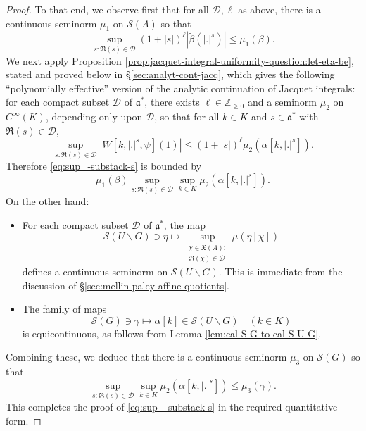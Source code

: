 \documentclass[reqno]{amsart}
\theoremstyle{plain} \newtheorem{theorem} {Theorem}
\theoremstyle{definition} \newtheorem{definition} [theorem] {Definition}
\theoremstyle{itplain} %
\numberwithin{equation}{section}
\numberwithin{theorem}{section}
\renewcommand{\geq}{\geqslant}
\renewcommand{\leq}{\leqslant}
\begin{document}
\begin{proof}
  To that end, we observe first that for all $\mathcal{D}, \ell$ as above,  there is a continuous seminorm $\mu_1$ on $\mathcal{S}(A)$ so that
  \begin{equation*}
    \sup_{s : \Re(s) \in \mathcal{D}} (1 + |s|)^{\ell} \left\lvert \tilde{\beta}(|.|^s) \right\rvert \leq \mu_1(\beta). 
  \end{equation*}
  We next apply Proposition \ref{prop:jacquet-integral-uniformity-question:let-eta-be}, stated and proved below in \S\ref{sec:analyt-cont-jacq}, which gives the following ``polynomially effective'' version of the analytic continuation of Jacquet integrals: for each compact subset $\mathcal{D}$ of $\mathfrak{a}^*$, there exists $\ell \in \mathbb{Z}_{\geq 0}$ and a seminorm $\mu_2$ on $C^\infty(K)$, depending only upon $\mathcal{D}$, so that for all $k \in K$ and $s \in \mathfrak{a}^*$ with $\Re(s) \in \mathcal{D}$,
  \begin{equation*}
    \sup_{s : \Re(s) \in \mathcal{D}} |W[k,|.|^s,\psi](1)| \leq (1 + |s|)^{\ell} \mu_2(\alpha[k,|.|^s]).   
  \end{equation*}
  Therefore \eqref{eq:sup_-substack-s} is bounded by
  \begin{equation*}
    \mu_1(\beta) \sup_{ s : \Re(s) \in \mathcal{D} } \sup_{k \in K} \mu_2(\alpha[k,|.|^s]).    
  \end{equation*}
  On the other hand:
  \begin{itemize}
  \item For each compact subset $\mathcal{D}$ of $\mathfrak{a}^*$, the map
  \begin{equation*}
    \mathcal{S}(U \backslash G)
    \ni \eta
    \mapsto \sup_{
      \substack{
        \chi \in \mathfrak{X}(A):  \\
          \Re(\chi) \in \mathcal{D}
      }
    }
    \mu(\eta[\chi])
  \end{equation*}
  defines a continuous seminorm on $\mathcal{S}(U \backslash G)$.  This is immediate from the discussion of \S\ref{sec:mellin-paley-affine-quotients}.
\item
  The family of maps
  \begin{equation*}
    \mathcal{S}(G) \ni \gamma \mapsto \alpha[k] \in \mathcal{S}(U \backslash G)
    \quad (k \in K)
  \end{equation*}
  is equicontinuous, as follows from Lemma \ref{lem:cal-S-G-to-cal-S-U-G}.
\end{itemize}
Combining these, we deduce that there is a continuous seminorm $\mu_3$ on $\mathcal{S}(G)$ so that
\begin{equation*}
  \sup_{ s : \Re(s) \in \mathcal{D} } \sup_{k \in K} \mu_2(\alpha[k,|.|^s]) \leq \mu_3(\gamma).    
\end{equation*}
This completes the proof of \eqref{eq:sup_-substack-s} in the required quantitative form.
\end{proof}
\end{document}
